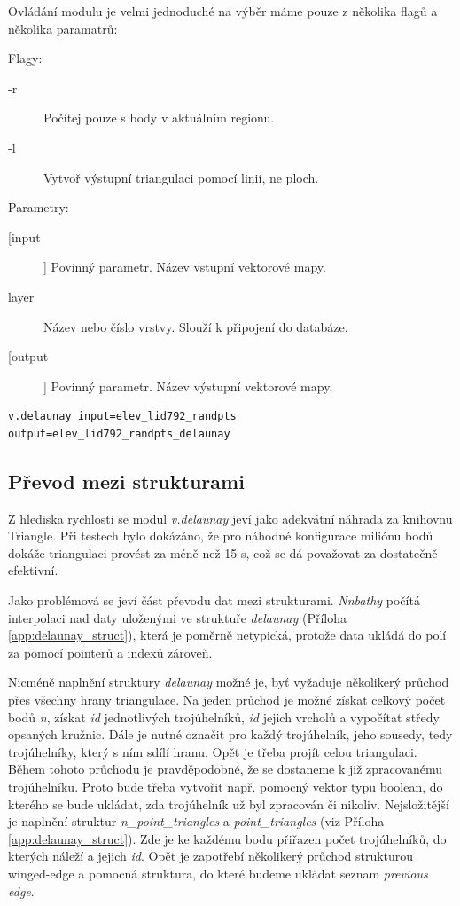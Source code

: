 \documentclass[12pt,a4paper]{article}
\begin{document}
Ovládání modulu je velmi jednoduché na výběr máme pouze z několika flagů a několika paramatrů:

\noindent Flagy:
\begin{description}
\item[-r] Počítej pouze s body v aktuálním regionu.
\item[-l] Vytvoř výstupní triangulaci pomocí linií, ne ploch.
\end{description}

\noindent Parametry:
\begin{description}
\item[[input]] Povinný parametr. Název vstupní vektorové mapy.
\item[layer] Název nebo číslo vrstvy. Slouží k připojení do databáze.
\item[[output]] Povinný parametr. Název výstupní vektorové mapy.
\end{description}

\begin{lstlisting}[caption={Volání modulu v.delaunay z příkazové řádky}]
v.delaunay input=elev_lid792_randpts output=elev_lid792_randpts_delaunay
\end{lstlisting}

\bigskip
\subsection{Převod mezi strukturami}
Z hlediska rychlosti se modul \emph{v.delaunay} jeví jako adekvátní náhrada za knihovnu Triangle. Při testech bylo dokázáno, že pro náhodné konfigurace miliónu bodů dokáže triangulaci provést za méně než 15 s, což se dá považovat za dostatečně efektivní.

Jako problémová se jeví část převodu dat mezi strukturami. \emph{Nnbathy} počítá interpolaci nad daty uloženými ve struktuře \emph{delaunay} (Příloha \ref{app:delaunay_struct}), která je poměrně netypická, protože data ukládá do polí za pomocí pointerů a indexů zároveň. 

Nicméně naplnění struktury \emph{delaunay} možné je,  byť vyžaduje několikerý průchod přes všechny hrany triangulace. Na jeden průchod je možné získat celkový počet bodů \emph{n}, získat \emph{id} jednotlivých trojúhelníků, \emph{id} jejich vrcholů a vypočítat středy opsaných kružnic. Dále je nutné označit pro každý trojúhelník, jeho sousedy, tedy trojúhelníky, který s ním sdílí hranu. Opět je třeba projít celou triangulaci. Během tohoto průchodu je pravděpodobné, že se dostaneme k již zpracovanému trojúhelníku. Proto bude třeba vytvořit např. pomocný vektor typu boolean, do kterého se bude ukládat, zda trojúhelník už byl zpracován či nikoliv. Nejsložitější je naplnění struktur \emph{n\_point\_triangles} a \emph{point\_triangles} (viz Příloha \ref{app:delaunay_struct}). Zde je ke každému bodu přiřazen počet trojúhelníků, do kterých náleží a jejich \emph{id}. Opět je zapotřebí několikerý průchod strukturou winged-edge a pomocná struktura, do které budeme ukládat seznam \emph{previous edge}.
\end{document}
